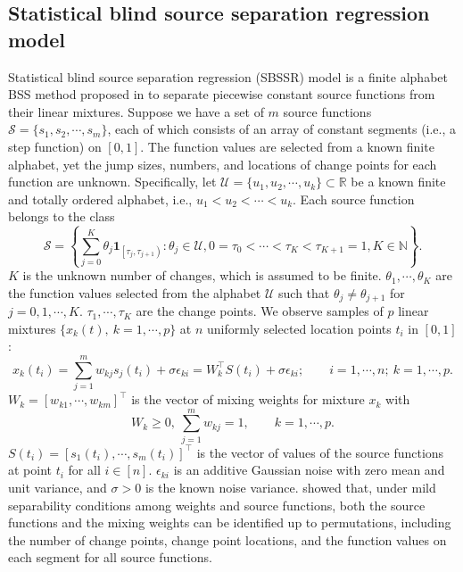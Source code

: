 \documentclass[12pt]{article}
\newcommand{\one}{\ensuremath{\mathbf{1}}}
\newcommand{\setS}{\mathcal{S}}
\begin{document}
\subsection{Statistical blind source separation regression model}\label{Sec:SBSSR}
Statistical blind source separation regression (SBSSR) model is a finite alphabet BSS method proposed in \citep{behr2018multiscale} to separate piecewise constant source functions from their linear mixtures. Suppose we have a set of $m$ source functions $\setS=\{s_1,s_2,\cdots,s_m\}$, each of which consists of an array of constant segments (i.e., a step function) on $[0,1]$. The function values are selected from a known finite alphabet, yet the jump sizes, numbers, and locations of change points for each function are unknown. Specifically, let $\mathcal{U}=\{u_1,u_2,\cdots,u_k\}\subset \mathbb{R}$ be a known finite and totally ordered alphabet, i.e., $u_1<u_2< \cdots <u_k$. Each source function belongs to the class 
\begin{equation*}
\setS =
\left\{\sum_{j=0}^{K} \theta_{j} \one_{\left[\tau_{j}, \tau_{j+1}\right)}: \theta_{j} \in \mathcal{U}, 0=\tau_{0}<\cdots<\tau_{K}<\tau_{K+1}=1, K \in \mathbb{N}\right\}.
\end{equation*}
$K$ is the unknown number of changes, which is assumed to be finite.  $\theta_1,\cdots, \theta_K$ are the function values selected from the alphabet $\mathcal{U}$ such that $\theta_j\neq \theta_{j+1}$ for $j=0,1,\cdots,K$. $\tau_1,\cdots, \tau_K$ are the change points. We observe samples of $p$ linear mixtures $\{x_k(t),~ k=1,\cdots,p\}$ at $n$ uniformly selected location points $t_i$ in $[0,1]$: 
\begin{equation}
x_k(t_i) = \sum_{j=1}^m w_{kj} s_j(t_i) + \sigma \epsilon_{ki} =  W_k^{\top} S(t_i) + \sigma \epsilon_{ki}; \qquad i=1,\cdots,n;~ k=1,\cdots,p.
\end{equation}
$W_k=[w_{k1},\cdots,w_{km}]^{\top}$ is the vector of mixing weights for mixture $x_k$ with
\begin{equation*}
W_k \geq 0,~ \sum_{j=1}^m w_{kj}=1,\qquad k=1,\cdots, p.
\end{equation*}
$S(t_i)=[s_1(t_i),\cdots,s_m(t_i)]^{\top}$ is the vector of values of the source functions at point $t_i$ for all $i\in [n]$. $\epsilon_{ki}$ is an additive Gaussian noise with zero mean and unit variance, and $\sigma>0$ is the known noise variance. \citet{behr2018multiscale} showed that, under mild separability conditions among weights and source functions, both the source functions and the mixing weights can be identified up to permutations, including the number of change points, change point locations, and the function values on each segment for all source functions. 
\end{document}
